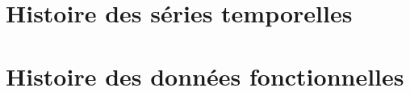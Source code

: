 \section{ Histoire des séries temporelles }

\pagebreak
\section{ Histoire des données fonctionnelles }

